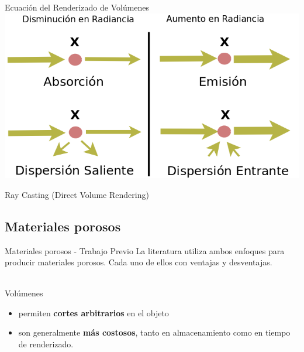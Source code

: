 \documentclass[spanish,unknownkeysallowed]{beamer}
\begin{document}
\begin{frame}{Ecuación del Renderizado de Volúmenes}
\includegraphics[scale = 0.55]{../figures/fenomenosrte}

Ray Casting (Direct Volume Rendering)
\end{frame}



\subsection{Materiales porosos}


\begin{frame}{Materiales porosos - Trabajo Previo}
La literatura utiliza ambos enfoques para producir materiales porosos. Cada uno de ellos con ventajas y desventajas.

\ \\

Volúmenes
\begin{block}{}
\begin{itemize}
\item permiten \textbf{cortes arbitrarios} en el objeto
\item son generalmente \textbf{más costosos}, tanto en almacenamiento como en tiempo de renderizado.
\end{itemize}
\end{block}
\end{frame}
\end{document}
